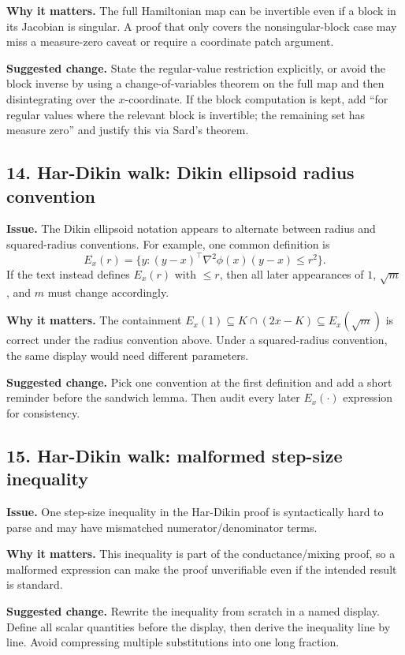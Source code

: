 \documentclass[11pt]{article}
\begin{document}
\textbf{Why it matters.}  The full Hamiltonian map can be invertible even if a block in its Jacobian is singular.  A proof that only covers the nonsingular-block case may miss a measure-zero caveat or require a coordinate patch argument.

\textbf{Suggested change.}  State the regular-value restriction explicitly, or avoid the block inverse by using a change-of-variables theorem on the full map and then disintegrating over the \(x\)-coordinate.  If the block computation is kept, add ``for regular values where the relevant block is invertible; the remaining set has measure zero'' and justify this via Sard's theorem.

\subsection*{14. Har-Dikin walk: Dikin ellipsoid radius convention}

\textbf{Issue.}  The Dikin ellipsoid notation appears to alternate between radius and squared-radius conventions.  For example, one common definition is
\[
E_x(r)=\{y:(y-x)^\top \nabla^2\phi(x)(y-x)\le r^2\}.
\]
If the text instead defines \(E_x(r)\) with \(\le r\), then all later appearances of \(1\), \(\sqrt m\), and \(m\) must change accordingly.

\textbf{Why it matters.}  The containment \(E_x(1)\subseteq K\cap(2x-K)\subseteq E_x(\sqrt m)\) is correct under the radius convention above.  Under a squared-radius convention, the same display would need different parameters.

\textbf{Suggested change.}  Pick one convention at the first definition and add a short reminder before the sandwich lemma.  Then audit every later \(E_x(\cdot)\) expression for consistency.

\subsection*{15. Har-Dikin walk: malformed step-size inequality}

\textbf{Issue.}  One step-size inequality in the Har-Dikin proof is syntactically hard to parse and may have mismatched numerator/denominator terms.

\textbf{Why it matters.}  This inequality is part of the conductance/mixing proof, so a malformed expression can make the proof unverifiable even if the intended result is standard.

\textbf{Suggested change.}  Rewrite the inequality from scratch in a named display.  Define all scalar quantities before the display, then derive the inequality line by line.  Avoid compressing multiple substitutions into one long fraction.
\end{document}

